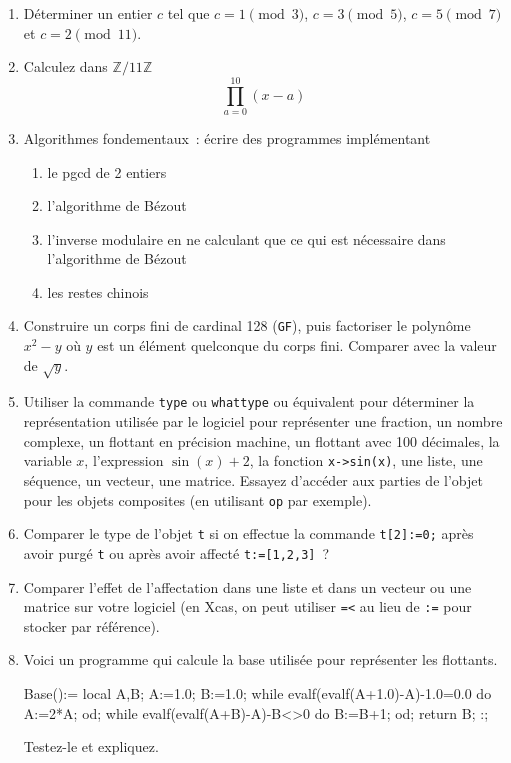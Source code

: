 \documentclass[a4paper,11pt]{article}
\begin{document}
\begin{giacjshere}
\begin{enumerate}
\item D\'eterminer un entier $c$ tel que $c=1 \pmod 3$, 
$c=3 \pmod 5$, $c=5 \pmod 7$ et $c=2 \pmod{11}$.
\item Calculez dans $\mathbb{Z}/11\mathbb{Z}$
\[  \prod_{a=0}^{10} (x-a)\]
\item Algorithmes fondementaux~: \'ecrire des programmes impl\'ementant
\begin{enumerate}
\item le pgcd de 2 entiers
\item l'algorithme de B\'ezout
\item l'inverse modulaire en ne calculant que ce qui est n\'ecessaire
dans l'algorithme de B\'ezout
\item les restes chinois
\end{enumerate}

\item Construire un corps fini de cardinal 128 (\verb|GF|), puis factoriser
le polyn\^ome $x^2-y$ o\`u $y$ est un \'el\'ement quelconque du corps
fini.
Comparer avec la valeur de $\sqrt{y}$.
\item Utiliser la commande {\tt type} ou {\tt whattype} ou \'equivalent
pour d\'eterminer la repr\'esentation
utilis\'ee par le logiciel pour repr\'esenter
une fraction, un nombre complexe, un flottant en pr\'ecision machine, 
un flottant avec 100 d\'ecimales, la variable $x$, l'expression $\sin(x)+2$,
la fonction {\tt x->sin(x)}, une liste, une s\'equence, un vecteur,
une matrice. Essayez d'acc\'eder aux parties de
l'objet pour les objets composites (en utilisant {\tt op} par exemple).
\item Comparer le type de l'objet \verb|t| si on effectue
la commande \verb|t[2]:=0;| apr\`es avoir purg\'e \verb|t|
ou apr\`es avoir affect\'e \verb|t:=[1,2,3]|~?
\item Comparer l'effet de l'affectation dans une liste et dans un
  vecteur ou une matrice sur votre logiciel (en Xcas, on peut utiliser
\verb|=<| au lieu de \verb|:=| pour stocker par r\'ef\'erence).
\item Voici un programme qui calcule la base utilis\'ee
pour repr\'esenter les flottants. 
\begin{giacprog}
Base():={
  local A,B;
  A:=1.0; B:=1.0;
  while evalf(evalf(A+1.0)-A)-1.0=0.0 do  A:=2*A; od;
  while evalf(evalf(A+B)-A)-B<>0 do B:=B+1; od;
  return B;
} :;
\end{giacprog}
Testez-le  et expliquez.


\end{enumerate}
\end{giacjshere}
\end{document}
